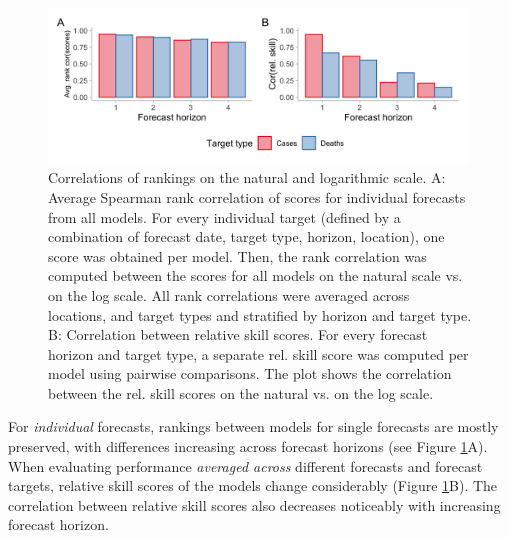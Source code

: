 \documentclass{article}
\begin{document}
\begin{figure}[h!]
    \centering
    \includegraphics[width=0.99\textwidth]{output/figures/HUB-correlations.png}
    \caption{Correlations of rankings on the natural and logarithmic scale. A: Average Spearman rank correlation of scores for individual forecasts from all models. For every individual target (defined by a combination of forecast date, target type, horizon, location), one score was obtained per model. Then, the rank correlation was computed between the scores for all models on the natural scale vs. on the log scale. All rank correlations were averaged across locations, and target types and stratified by horizon and target type. B: Correlation between relative skill scores. For every forecast horizon and target type, a separate rel. skill score was computed per model using pairwise comparisons. The plot shows the correlation between the rel. skill scores on the natural vs. on the log scale.}
    \label{fig:HUB-cors}
\end{figure}

For \textit{individual} forecasts, rankings between models for single forecasts are mostly preserved, with differences increasing across forecast horizons (see Figure \ref{fig:HUB-cors}A). When evaluating performance \textit{averaged across} different forecasts and forecast targets, relative skill scores of the models change considerably (Figure \ref{fig:HUB-cors}B). The correlation between relative skill scores also decreases noticeably with increasing forecast horizon. 
\end{document}
